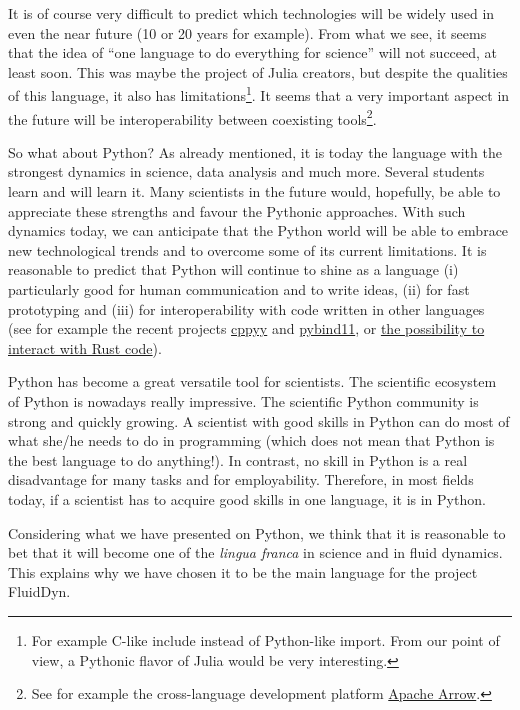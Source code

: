 It is of course very difficult to predict which technologies will be widely
used in even the near future (10 or 20 years for example).
%
From what we see, it seems that the idea of ``one language to do everything for
science'' will not succeed, at least soon.  This was maybe the project of Julia
creators, but despite the qualities of this language, it also has
limitations\footnote{For example C-like include instead of Python-like
import. From our point of view, a Pythonic flavor of Julia would be very
interesting.}.
%
It seems that a very important aspect in the future will be interoperability
between coexisting tools\footnote{See for example the cross-language development
platform \href{https://arrow.apache.org/}{Apache Arrow}.}.

So what about Python?  As already mentioned, it is today the language with the
strongest dynamics in science, data analysis and much more.  Several students
learn and will learn it. Many scientists in the future would, hopefully, be
able to appreciate these strengths and favour the Pythonic approaches.  With
such dynamics today, we can anticipate that the Python world will be able to
embrace new technological trends and to overcome some of its current
limitations.
%
It is reasonable to predict that Python will continue to shine as a language
(i) particularly good for human communication and to write ideas, (ii) for fast
prototyping and (iii) for interoperability with code written in other languages
(see for example the recent projects \href{https://cppyy.readthedocs.io}{cppyy}
and \href{https://github.com/pybind/pybind11/}{pybind11}, or
\href{https://github.com/PyO3}{the possibility to interact with Rust code}).


Python has become a great versatile tool for scientists.  The scientific
ecosystem of Python is nowadays really impressive.  The scientific Python
community is strong and quickly growing.
%
A scientist with good skills in Python can do most of what she/he needs to do in
programming (which does not mean that Python is the best language to do
anything!).
%
In contrast, no skill in Python is a real disadvantage for many tasks and for
employability.
%
Therefore, in most fields today, if a scientist has to acquire good skills in
one language, it is in Python.

Considering what we have presented on Python, we think that it is reasonable to
bet that it will become one of the \textit{lingua franca} in science and in
fluid dynamics.  This explains why we have chosen it to be the main language
for the project FluidDyn.



